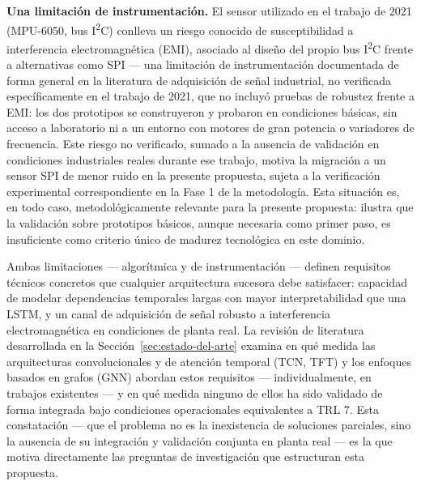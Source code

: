 \documentclass[11pt]{article}
\begin{document}
\textbf{Una limitación de instrumentación.} El sensor utilizado en el trabajo de 2021 (MPU-6050, bus I\textsuperscript{2}C) conlleva un riesgo conocido de susceptibilidad a interferencia electromagnética (EMI), asociado al diseño del propio bus I\textsuperscript{2}C frente a alternativas como SPI --- una limitación de instrumentación documentada de forma general en la literatura de adquisición de señal industrial, no verificada específicamente en el trabajo de 2021, que no incluyó pruebas de robustez frente a EMI: los dos prototipos se construyeron y probaron en condiciones básicas, sin acceso a laboratorio ni a un entorno con motores de gran potencia o variadores de frecuencia. Este riesgo no verificado, sumado a la ausencia de validación en condiciones industriales reales durante ese trabajo, motiva la migración a un sensor SPI de menor ruido en la presente propuesta, sujeta a la verificación experimental correspondiente en la Fase 1 de la metodología. Esta situación es, en todo caso, metodológicamente relevante para la presente propuesta: ilustra que la validación sobre prototipos básicos, aunque necesaria como primer paso, es insuficiente como criterio único de madurez tecnológica en este dominio.

Ambas limitaciones --- algorítmica y de instrumentación --- definen requisitos técnicos concretos que cualquier arquitectura sucesora debe satisfacer: capacidad de modelar dependencias temporales largas con mayor interpretabilidad que una LSTM, y un canal de adquisición de señal robusto a interferencia electromagnética en condiciones de planta real. La revisión de literatura desarrollada en la Sección~\ref{sec:estado-del-arte} examina en qué medida las arquitecturas convolucionales y de atención temporal (TCN, TFT) y los enfoques basados en grafos (GNN) abordan estos requisitos --- individualmente, en trabajos existentes --- y en qué medida ninguno de ellos ha sido validado de forma integrada bajo condiciones operacionales equivalentes a TRL 7. Esta constatación --- que el problema no es la inexistencia de soluciones parciales, sino la ausencia de su integración y validación conjunta en planta real --- es la que motiva directamente las preguntas de investigación que estructuran esta propuesta.
\end{document}
